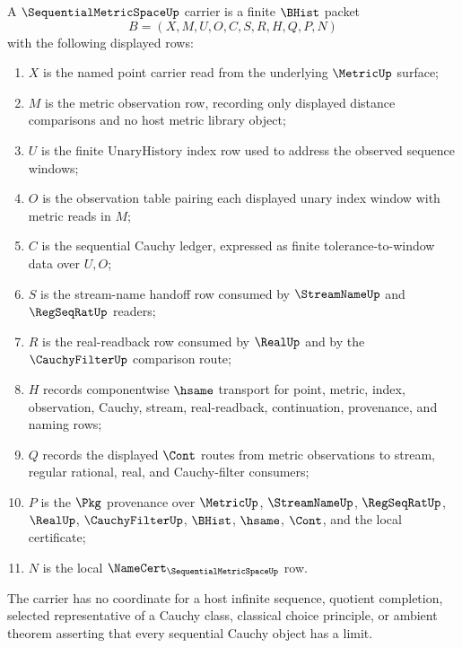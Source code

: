 \begin{definition}
\label{def:sequential-metric-space-carrier}
A $\SequentialMetricSpaceUp$ carrier is a finite $\BHist$ packet
$$
B=(X,M,U,O,C,S,R,H,Q,P,N)
$$
with the following displayed rows:
\begin{enumerate}
\item $X$ is the named point carrier read from the underlying $\MetricUp$ surface;
\item $M$ is the metric observation row, recording only displayed distance comparisons and no host metric library object;
\item $U$ is the finite $\mathrm{UnaryHistory}$ index row used to address the observed sequence windows;
\item $O$ is the observation table pairing each displayed unary index window with metric reads in $M$;
\item $C$ is the sequential Cauchy ledger, expressed as finite tolerance-to-window data over $U,O$;
\item $S$ is the stream-name handoff row consumed by $\StreamNameUp$ and $\RegSeqRatUp$ readers;
\item $R$ is the real-readback row consumed by $\RealUp$ and by the $\CauchyFilterUp$ comparison route;
\item $H$ records componentwise $\hsame$ transport for point, metric, index, observation, Cauchy, stream, real-readback, continuation, provenance, and naming rows;
\item $Q$ records the displayed $\Cont$ routes from metric observations to stream, regular rational, real, and Cauchy-filter consumers;
\item $P$ is the $\Pkg$ provenance over $\MetricUp$, $\StreamNameUp$, $\RegSeqRatUp$, $\RealUp$, $\CauchyFilterUp$, $\BHist$, $\hsame$, $\Cont$, and the local certificate;
\item $N$ is the local $\NameCert_{\SequentialMetricSpaceUp}$ row.
\end{enumerate}
The carrier has no coordinate for a host infinite sequence, quotient completion, selected representative of a Cauchy class, classical choice principle, or ambient theorem asserting that every sequential Cauchy object has a limit.
\end{definition}

